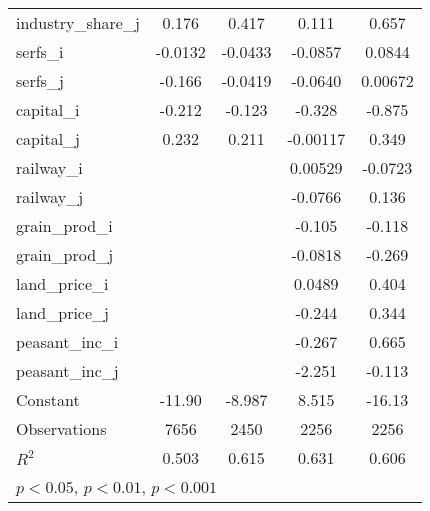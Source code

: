 {\begin{longtable}{l*{4}{c}}
industry\_share\_j    &       0.176         &       0.417\sym{**} &       0.111         &       0.657\sym{***}\\
serfs\_i             &     -0.0132         &     -0.0433         &     -0.0857         &      0.0844         \\
serfs\_j             &      -0.166\sym{***}&     -0.0419         &     -0.0640         &     0.00672         \\
capital\_i           &      -0.212         &      -0.123         &      -0.328         &      -0.875\sym{**} \\
capital\_j           &       0.232         &       0.211         &    -0.00117         &       0.349         \\
railway\_i           &                     &                     &     0.00529         &     -0.0723         \\
railway\_j           &                     &                     &     -0.0766         &       0.136\sym{*}  \\
grain\_prod\_i        &                     &                     &      -0.105         &      -0.118         \\
grain\_prod\_j        &                     &                     &     -0.0818         &      -0.269\sym{**} \\
land\_price\_i        &                     &                     &      0.0489         &       0.404\sym{*}  \\
land\_price\_j        &                     &                     &      -0.244         &       0.344\sym{*}  \\
peasant\_inc\_i       &                     &                     &      -0.267         &       0.665         \\
peasant\_inc\_j       &                     &                     &      -2.251\sym{**} &      -0.113         \\
Constant            &      -11.90\sym{***}&      -8.987\sym{**} &       8.515         &      -16.13         \\
\hline
Observations        &        7656         &        2450         &        2256         &        2256         \\
\(R^{2}\)           &       0.503         &       0.615         &       0.631         &       0.606         \\
\hline\hline
\multicolumn{5}{l}{\footnotesize \sym{*} \(p<0.05\), \sym{**} \(p<0.01\), \sym{***} \(p<0.001\)}\\
\end{longtable}
}
